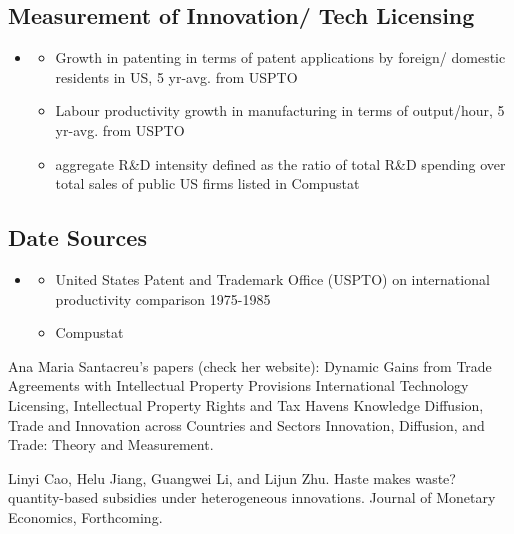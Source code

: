 	\subsection{Measurement of Innovation/ Tech Licensing}
	\begin{itemize}
		\item \cite{AkcigitAtesImpullitti2018}
			\begin{itemize}
			\item Growth in patenting in terms of patent applications by foreign/ domestic residents in US, 5 yr-avg. from USPTO
			\item Labour productivity growth in manufacturing in terms of output/hour, 5 yr-avg. from USPTO
			\item aggregate R\&D intensity defined as the ratio of total R\&D spending over total sales of public US firms listed in Compustat
			\end{itemize}
	\end{itemize}
	
	\subsection{Date Sources}
	\begin{itemize}
		\item \cite{AkcigitAtesImpullitti2018}
			\begin{itemize}
			\item United States Patent and Trademark Office (USPTO) on international productivity comparison 1975-1985
			\item Compustat
			\end{itemize}
	\end{itemize}
 
Ana Maria Santacreu’s papers (check her website):  
Dynamic Gains from Trade Agreements with Intellectual Property Provisions \cite{Santacreu2022}
International Technology Licensing, Intellectual Property Rights and Tax Havens \cite{Santacreu2023}
Knowledge Diffusion, Trade and Innovation across Countries and Sectors  \cite{CaiLiSantacreu2022}
 Innovation, Diffusion, and Trade: Theory and Measurement.  \cite{Santacreu2015}

Linyi Cao, Helu Jiang, Guangwei Li, and Lijun Zhu. Haste makes waste? quantity-based subsidies under heterogeneous innovations. Journal of Monetary Economics, Forthcoming.\cite{CaoJiangLiZhu2023}





\newpage


